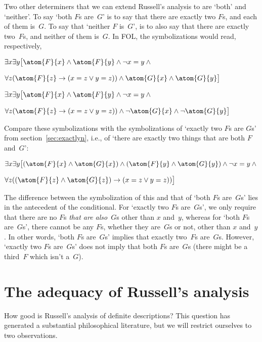 Two other determiners that we can extend Russell's analysis to are `both' and `neither'.  To say `both $F$s are~$G$' is to say that there are exactly two $F$s, and each of them is~$G$. To say that `neither $F$ is~$G$', is to also say that there are exactly two~$F$s, and neither of them is~$G$. In FOL, the symbolizations would read, respectively,
\begin{earg}
	\item[] $\exists x\exists y\bigl[\atom{F}{x} \eand \atom{F}{y} \eand \enot x=y \eand {}$
	\item[]\qquad$\forall z(\atom{F}{z} \eif (x = z \lor y = z)) \eand \atom{G}{x} \eand \atom{G}{y}\bigr]$
	\item[] $\exists x\exists y\bigl[\atom{F}{x} \eand \atom{F}{y} \eand \enot x=y \eand  {}$
	\item[]\qquad$\forall z(\atom{F}{z} \eif (x = z \lor y = z)) \eand \enot \atom{G}{x} \eand \enot \atom{G}{y}\bigr]$
\end{earg}
Compare these symbolizations with the symbolizations of `exactly two $F$s are $G$s' from section~\ref{sec:exactlyn}, i.e., of `there are exactly two things that are both $F$ and~$G$':
\begin{earg}
	\item[] $\exists x\exists y\bigl[(\atom{F}{x} \eand \atom{G}{x}) \eand (\atom{F}{y} \eand \atom{G}{y}) \eand \enot x=y \eand {}$
	\item[]\qquad$\forall z((\atom{F}{z} \eand \atom{G}{z}) \eif (x = z \lor y = z))\bigr]$
\end{earg}
The difference between the symbolization of this and that of `both $F$s are~$G$s' lies in the antecedent of the conditional. For `exactly two $F$s are~$G$s', we only require that there are no $F$s \emph{that are also}~$G$s other than $x$ and~$y$, whereas for `both $F$s are~$G$s', there cannot be any $F$s, whether they are~$G$s or not, other than $x$ and~$y$. In other words, `both $F$s are~$G$s' implies that exactly two~$F$s are~$G$s. However, `exactly two $F$s are~$G$s' does not imply that both $F$s are~$G$s (there might be a third~$F$ which isn't a~$G$).

\section{The adequacy of Russell's analysis}
How good is Russell's analysis of definite descriptions? This question has generated a substantial philosophical literature, but we will restrict ourselves to two observations.

